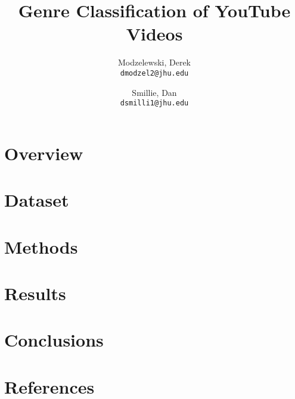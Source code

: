 \documentclass{article}
\title{Genre Classification of YouTube Videos}
\author{
  Modzelewski, Derek\\
  \texttt{dmodzel2@jhu.edu}
  \and
  Smillie, Dan\\
  \texttt{dsmilli1@jhu.edu}
}
\begin{document}
\maketitle

\tableofcontents

\section{Overview}

\section{Dataset} %

\section{Methods} %

\section{Results}

\section{Conclusions}

\section{References}







%
\end{document}
